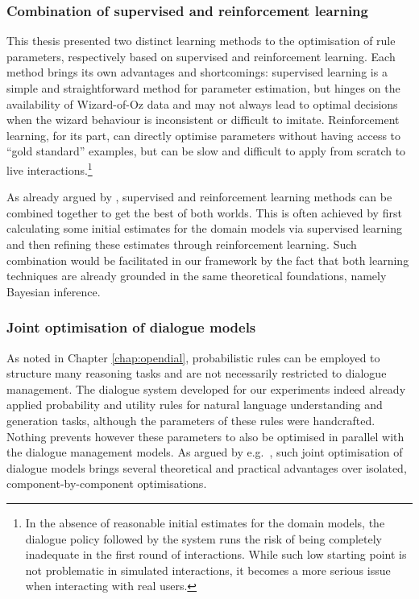 \subsubsection*{Combination of supervised and reinforcement learning}

This thesis presented two distinct learning methods to the optimisation of rule parameters, respectively based on supervised and reinforcement learning.  Each method brings its own advantages and shortcomings: supervised learning is a simple and straightforward method for parameter estimation, but hinges on the availability of Wizard-of-Oz data and may not always lead to optimal decisions when the wizard behaviour is inconsistent or difficult to imitate.  Reinforcement learning, for its part, can directly optimise parameters without having access to ``gold standard'' examples, but can be slow and difficult to apply from scratch to live interactions.\footnote{In the absence of reasonable initial estimates for the domain models, the dialogue policy followed by the system runs the risk of being completely inadequate in the first round of interactions.  While such low starting point is not problematic in simulated interactions, it becomes a more serious issue when interacting with real users.} 

As already argued by \cite{williams2003,rieser2006,Henderson:2008}, supervised and reinforcement learning methods can be combined together to get the best of both worlds. This is often achieved by first calculating some initial estimates for the domain models via supervised learning and then refining these estimates through reinforcement learning. Such combination would be facilitated in our framework by the fact that both learning techniques are already grounded in the same theoretical foundations, namely Bayesian inference. 

\subsubsection*{Joint optimisation of dialogue models}

As noted in Chapter \ref{chap:opendial}, probabilistic rules can be employed to structure many reasoning tasks and are not necessarily restricted to dialogue management. The dialogue system developed for our experiments indeed already applied probability and utility rules for natural language understanding and generation tasks, although the parameters of these rules were handcrafted. Nothing prevents however these parameters to also be optimised in parallel with the dialogue management models. As argued by e.g.\ \cite{Lemon:2011}, such joint optimisation of dialogue models brings several theoretical and practical advantages over isolated, component-by-component optimisations.

